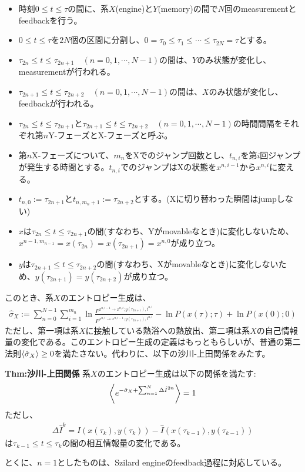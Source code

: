 \documentclass[a4paper,11pt]{jsarticle}
\numberwithin{equation}{section}
\begin{document}
\begin{itemize}
    \item 時刻$0 \leq t \leq \tau$の間に、系$X$(engine)と$Y$(memory)の間で$N$回のmeasurementとfeedbackを行う。
    \item $0 \leq t \leq \tau$を$2N$個の区間に分割し、$ 0 = \tau_0 \leq \tau_1 \leq \cdots \leq \tau_{2N} = \tau$とする。
    \item $\tau_{2n} \leq t \leq \tau_{2n+1}\quad(n=0,1,\cdots,N-1)$の間は、$Y$のみ状態が変化し、measurementが行われる。
    \item $\tau_{2n+1} \leq t \leq \tau_{2n+2}\quad(n=0,1,\cdots,N-1)$の間は、$X$のみ状態が変化し、feedbackが行われる。
    \item $\tau_{2n} \leq t \leq \tau_{2n+1}$と$\tau_{2n+1} \leq t \leq \tau_{2n+2}\quad(n=0,1,\cdots,N-1)$の時間間隔をそれぞれ第$n$Y-フェーズとX-フェーズと呼ぶ。
    \item 第$n$X-フェーズについて、$m_n$をXでのジャンプ回数とし、$t_{n,i}$を第$i$回ジャンプが発生する時間とする。$t_{n,i}$でのジャンプはXの状態を$x^{n,i-1}$から$x^{n,i}$に変える。
    \item $t_{n,0} := \tau_{2n+1}$と$t_{n,m_n+1} := \tau_{2n+2}$とする。(Xに切り替わった瞬間はjumpしない)
    \item $x$は$\tau_{2n} \leq t \leq \tau_{2n+1}$の間(すなわち、Yがmovableなとき)に変化しないため、$x^{n-1,m_{n-1}} = x(\tau_{2n}) = x(\tau_{2n+1}) = x^{n,0}$が成り立つ。
    \item $y$は$\tau_{2n+1} \leq t \leq \tau_{2n+2}$の間(すなわち、Xがmovableなとき)に変化しないため、$y(\tau_{2n+1}) = y(\tau_{2n+2})$が成り立つ。
\end{itemize}

このとき、系$X$のエントロピー生成は、
\begin{align}
    \hat{\sigma}_X := \sum^{N-1}_{n=0} \sum^{m_n}_{i=1} \ln \frac{P^{x^{n,i-1} \to x^{n,i}; y(\tau_{2n+1}), t^{n,i}}}{P^{x^{n,i} \to x^{n,i-1}; y(\tau_{2n+1}), t^{n,i}}} - \ln P(x(\tau); \tau) + \ln P(x(0); 0)
\end{align}
ただし、第一項は系$X$に接触している熱浴への熱放出、第二項は系$X$の自己情報量の変化である。このエントロピー生成の定義はもっともらしいが、普通の第二法則$\ev{\hat{\sigma}_X} \geq 0$を満たさない。代わりに、以下の沙川-上田関係をみたす。
\begin{itembox}[l]{\textbf{Thm:沙川-上田関係}}
    系$X$のエントロピー生成は以下の関係を満たす:
    \begin{align}
        \ev{e^{-\hat{\sigma}_X+\sum_{n=1}^N\Delta \hat{I}^{2n} }} = 1 \label{eq:s-u}
    \end{align}
    ただし、
    \begin{align}
        \Delta \hat{I}^{k} = \hat{I}(x(\tau_{k}),y(\tau_{k})) - \hat{I}(x(\tau_{k-1}),y(\tau_{k-1}))
    \end{align}
    は$\tau_{k-1} \leq t \leq \tau_{k}$の間の相互情報量の変化である。
\end{itembox}
とくに、$n=1$としたものは、Szilard engineのfeedback過程に対応している。\\
\end{document}
